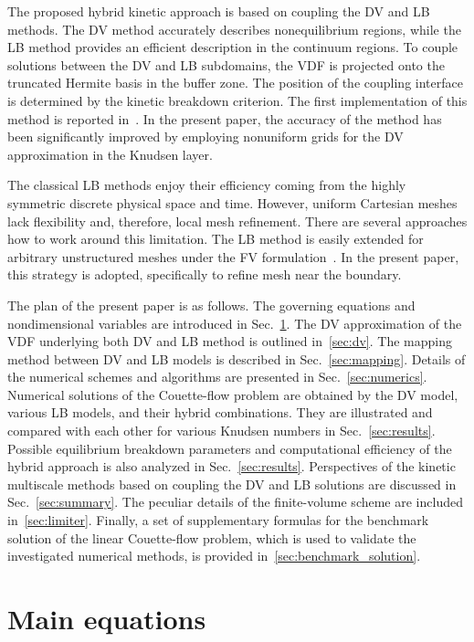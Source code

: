 \documentclass{elsarticle} %
\begin{document}
The proposed hybrid kinetic approach is based on coupling the DV and LB methods.
The DV method accurately describes nonequilibrium regions,
while the LB method provides an efficient description in the continuum regions.
To couple solutions between the DV and LB subdomains,
the VDF is projected onto the truncated Hermite basis in the buffer zone.
The position of the coupling interface is determined by the kinetic breakdown criterion.
The first implementation of this method is reported in~\cite{Aristov2019}.
In the present paper, the accuracy of the method has been significantly improved
by employing nonuniform grids for the DV approximation in the Knudsen layer.

The classical LB methods enjoy their efficiency coming from the highly symmetric discrete physical space and time.
However, uniform Cartesian meshes lack flexibility and, therefore, local mesh refinement.
There are several approaches how to work around this limitation.
The LB method is easily extended for arbitrary unstructured meshes
under the FV formulation~\cite{Succi1992, Peng1999, Patil2009, Li2016}.
In the present paper, this strategy is adopted, specifically to refine mesh near the boundary.

The plan of the present paper is as follows.
The governing equations and nondimensional variables are introduced in Sec.~\ref{sec:equations}.
The DV approximation of the VDF underlying both DV and LB method is outlined in~\ref{sec:dv}.
The mapping method between DV and LB models is described in Sec.~\ref{sec:mapping}.
Details of the numerical schemes and algorithms are presented in Sec.~\ref{sec:numerics}.
Numerical solutions of the Couette-flow problem are obtained by the DV model,
various LB models, and their hybrid combinations.
They are illustrated and compared with each other for various Knudsen numbers in Sec.~\ref{sec:results}.
Possible equilibrium breakdown parameters and computational efficiency of the hybrid approach
is also analyzed in Sec.~\ref{sec:results}.
Perspectives of the kinetic multiscale methods based on coupling the DV and LB solutions
are discussed in Sec.~\ref{sec:summary}.
The peculiar details of the finite-volume scheme are included in~\ref{sec:limiter}.
Finally, a set of supplementary formulas for the benchmark solution of the linear Couette-flow problem,
which is used to validate the investigated numerical methods, is provided in~\ref{sec:benchmark_solution}.

\section{Main equations}\label{sec:equations}
\end{document}
